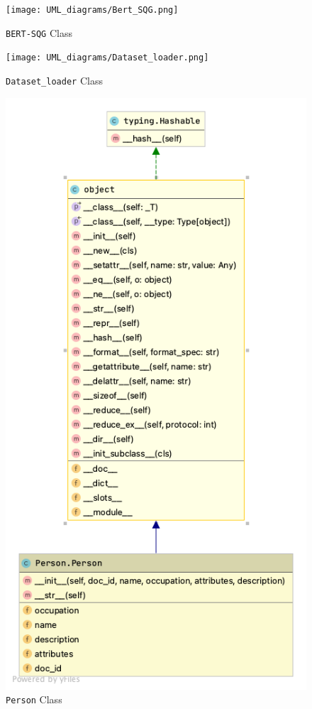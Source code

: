 \documentclass{mefsdp}
\begin{document}
	\begin{appendix}
		\begin{figure}[h!]
			\centering
				\centering
				\texttt{[image: UML\_diagrams/Bert\_SQG.png]}
				\caption{\texttt{BERT-SQG} Class\label{fig:bert_sqg}}
		\end{figure}
		\begin{figure}[h!]
				\centering
				\texttt{[image: UML\_diagrams/Dataset\_loader.png]}
				\caption{\texttt{Dataset\_loader} Class\label{fig:bert_dataset_loader}}
		\end{figure}
		
		\begin{figure}[h!]
			\centering
			\centering
			\includegraphics[scale=.5]{UML_diagrams/Person.png}
			\caption{\texttt{Person} Class\label{fig:dataset_person}}
		\end{figure}
		

\end{appendix}
\end{document}
